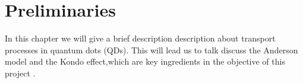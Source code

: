 \chapter{Preliminaries \label{chap:Preliminaries}}



In this chapter we will give a brief description description about transport processes in quantum dots (QDs). This will lead us to talk discuss the Anderson model and the Kondo effect,which are key ingredients in the objective of this project . 

